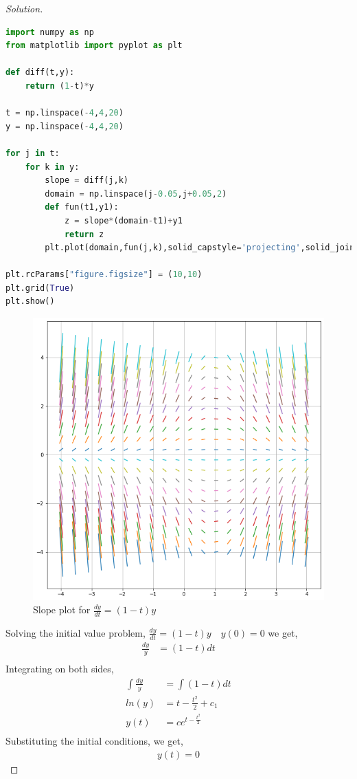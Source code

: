 \documentclass{article}
\newenvironment{solution}
{\renewcommand\qedsymbol{$\blacksquare$}\begin{proof}[Solution]}{\end{proof}}
\begin{document}
\begin{solution}
\begin{lstlisting}[language=Python, caption=Slope plot code]
import numpy as np
from matplotlib import pyplot as plt

def diff(t,y):
    return (1-t)*y

t = np.linspace(-4,4,20)
y = np.linspace(-4,4,20)

for j in t:
    for k in y:
        slope = diff(j,k)
        domain = np.linspace(j-0.05,j+0.05,2)
        def fun(t1,y1):
            z = slope*(domain-t1)+y1
            return z
        plt.plot(domain,fun(j,k),solid_capstyle='projecting',solid_joinstyle='bevel')
        
plt.rcParams["figure.figsize"] = (10,10)
plt.grid(True)
plt.show()
\end{lstlisting}
\begin{figure}[H]
\caption{Slope plot for $\frac{dy}{dt} = (1-t)y$}
\centering
\includegraphics[width=1.0\textwidth]{slope_plot}
\end{figure}
Solving the initial value problem,
	$\frac{dy}{dt} = (1-t)y \quad y(0) = 0$
we get, \\
\begin{equation}
\begin{split}
	\frac{dy}{y} & = (1-t)dt\\
\end{split}
\end{equation}
Integrating on both sides,
\begin{equation}
\begin{split}
	\int{\frac{dy}{y}} &= \int{(1-t)dt}\\
	ln(y) &= t-\frac{t^2}{2}+c_1\\
	y(t) &= ce^{t-\frac{t^2}{2}}\\
\end{split}
\end{equation}
Substituting the initial conditions, we get,
\begin{equation}
\begin{split}
	y(t) = 0
\end{split}
\end{equation}


\end{solution}
\end{document}
